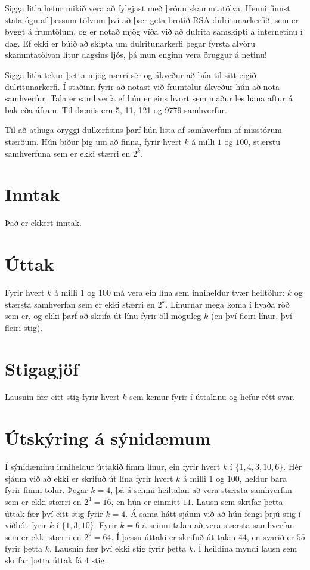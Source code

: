 Sigga litla hefur mikið vera að fylgjast með þróun skammtatölva. Henni finnst stafa ógn af þessum tölvum því að þær geta brotið RSA dulritunarkerfið, sem er byggt á frumtölum, og er notað mjög víða við að dulrita samskipti á internetinu í dag. Ef ekki er búið að skipta um dulritunarkerfi þegar fyrsta alvöru skammtatölvan lítur dagsins ljós, þá mun enginn vera öruggur á netinu!

Sigga litla tekur þetta mjög nærri sér og ákveður að búa til sitt eigið dulritunarkerfi. Í staðinn fyrir að notast við frumtölur ákveður hún að nota samhverfur. Tala er samhverfa ef hún er eins hvort sem maður les hana aftur á bak eða áfram. Til dæmis eru 5, 11, 121 og 9779 samhverfur.

Til að athuga öryggi dulkerfisins þarf hún lista af samhverfum af misstórum stærðum. Hún biður þig um að finna, fyrir hvert $k$ á milli $1$ og $100$, stærstu samhverfuna sem er ekki stærri en $2^k$.

\section*{Inntak}
Það er ekkert inntak.

\section*{Úttak}
Fyrir hvert $k$ á milli $1$ og $100$ má vera ein lína sem inniheldur tvær heiltölur: $k$ og stærsta samhverfan sem er ekki stærri en $2^k$. Línurnar mega koma í hvaða röð sem er, og ekki þarf að skrifa út línu fyrir öll möguleg $k$ (en því fleiri línur, því fleiri stig).

\section*{Stigagjöf}
Lausnin fær eitt stig fyrir hvert $k$ sem kemur fyrir í úttakinu og hefur rétt svar.

\section*{Útskýring á sýnidæmum}
Í sýnidæminu inniheldur úttakið fimm línur, ein fyrir hvert $k$ í $\{1,4,3,10,6\}$. Hér sjáum við að ekki er skrifuð út lína fyrir hvert $k$ á milli $1$ og $100$, heldur bara fyrir fimm tölur. Þegar $k=4$, þá á seinni heiltalan að vera stærsta samhverfan sem er ekki stærri en $2^4 = 16$, en hún er einmitt $11$. Lausn sem skrifar þetta úttak fær því eitt stig fyrir $k=4$. Á sama hátt sjáum við að hún fengi þrjú stig í viðbót fyrir $k$ í $\{1,3,10\}$. Fyrir $k=6$ á seinni talan að vera stærsta samhverfan sem er ekki stærri en $2^6 = 64$. Í þessu úttaki er skrifuð út talan $44$, en svarið er $55$ fyrir þetta $k$. Lausnin fær því ekki stig fyrir þetta $k$. Í heildina myndi lausn sem skrifar þetta úttak fá $4$ stig.
